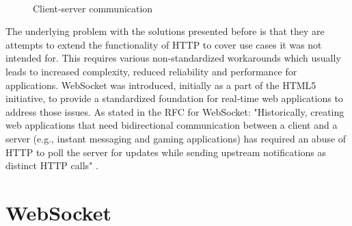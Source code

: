 \\
\begin{figure}[h!]
	\centering
	 \hfill
	\caption{Client-server communication}
\end{figure}

\noindent
The underlying problem with the solutions presented before is that they are attempts to extend the functionality of HTTP to cover use cases it was not intended for. This requires various non-standardized workarounds which usually leads to increased complexity, reduced reliability and performance for applications. WebSocket was introduced, initially as a part of the HTML5 initiative, to provide a standardized foundation for real-time web applications to address those issues. As stated in the RFC for WebSocket: "Historically, creating web applications that need bidirectional communication between a client and a server (e.g., instant messaging and gaming applications) has required an abuse of HTTP to poll the server for updates while sending upstream notifications as distinct HTTP calls" \cite{fette2011websocket}.

\section{WebSocket}

